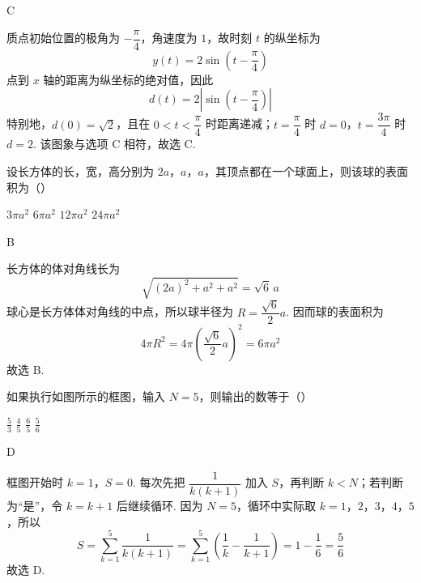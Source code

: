 \begin{answer}
C
\end{answer}

\begin{solution}
质点初始位置的极角为 \(-\dfrac{\pi}{4}\)，角速度为 \(1\)，故时刻 \(t\) 的纵坐标为
\[
y(t)=2\sin\left(t-\frac{\pi}{4}\right)
\]
点到 \(x\) 轴的距离为纵坐标的绝对值，因此
\[
d(t)=2\left|\sin\left(t-\frac{\pi}{4}\right)\right|
\]
特别地，\(d(0)=\sqrt{2}\)，且在 \(0<t<\dfrac{\pi}{4}\) 时距离递减；\(t=\dfrac{\pi}{4}\) 时 \(d=0\)，\(t=\dfrac{3\pi}{4}\) 时 \(d=2\). 该图象与选项 C 相符，故选 C.
\end{solution}

\begin{problem}
设长方体的长，宽，高分别为 \(2a\)，\(a\)，\(a\)，其顶点都在一个球面上，则该球的表面积为（\quad）

\choices
    {\(3\pi a^{2}\)}
    {\(6\pi a^{2}\)}
    {\(12\pi a^{2}\)}
    {\(24\pi a^{2}\)}
\end{problem}

\begin{answer}
B
\end{answer}

\begin{solution}
长方体的体对角线长为
\[
\sqrt{(2a)^{2}+a^{2}+a^{2}}=\sqrt{6}\,a
\]
球心是长方体体对角线的中点，所以球半径为 \(R=\dfrac{\sqrt{6}}{2}a\). 因而球的表面积为
\[
4\pi R^{2}=4\pi\left(\frac{\sqrt{6}}{2}a\right)^{2}=6\pi a^{2}
\]
故选 B.
\end{solution}

\begin{problem}
如果执行如图所示的框图，输入 \(N = 5\)，则输出的数等于（\quad）

\choices
    {\(\frac{5}{3}\)}
    {\(\frac{4}{5}\)}
    {\(\frac{6}{5}\)}
    {\(\frac{5}{6}\)}
\end{problem}

\begin{answer}
D
\end{answer}

\begin{solution}
框图开始时 \(k=1\)，\(S=0\). 每次先把 \(\dfrac{1}{k(k+1)}\) 加入 \(S\)，再判断 \(k<N\)；若判断为“是”，令 \(k=k+1\) 后继续循环. 因为 \(N=5\)，循环中实际取 \(k=1\)，\(2\)，\(3\)，\(4\)，\(5\)，所以
\[
S=\sum_{k=1}^{5}\frac{1}{k(k+1)}
=\sum_{k=1}^{5}\left(\frac{1}{k}-\frac{1}{k+1}\right)
=1-\frac{1}{6}=\frac{5}{6}
\]
故选 D.
\end{solution}

